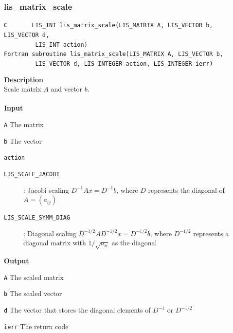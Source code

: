 \documentclass[a4paper]{article}
\newcommand{\namelistlabel}[1]{\mbox{#1}\hfill}
\newenvironment{namelist}[1]{%
\begin{list}{}
  {\let\makelabel\namelistlabel
  \settowidth{\labelwidth}{#1}
  \setlength{\leftmargin}{1.1\labelwidth}}
  }{%
\end{list}}
\begin{document}
\newpage
\subsubsection{lis\_matrix\_scale}
\begin{screen}
\verb|C       LIS_INT lis_matrix_scale(LIS_MATRIX A, LIS_VECTOR b, LIS_VECTOR d,|\\
\verb|         LIS_INT action)|\\
\verb|Fortran subroutine lis_matrix_scale(LIS_MATRIX A, LIS_VECTOR b,|\\
\verb|         LIS_VECTOR d, LIS_INTEGER action, LIS_INTEGER ierr)|
\end{screen}
{\bf Description}\\
\indent
Scale matrix $A$ and vector $b$.
\\ \\
\noindent
{\bf Input}
\begin{namelist}{XXXXXXXXXXXXXXXXXXXX}
\item[\tt A] The matrix
\item[\tt b] The vector
\item[\tt action] \begin{description}
\item[\tt LIS\_SCALE\_JACOBI]: Jacobi scaling $D^{-1}Ax=D^{-1}b$, where $D$
	   represents the diagonal of $A=(a_{ij})$
\item[\tt LIS\_SCALE\_SYMM\_DIAG]: Diagonal scaling
	   $D^{-1/2}AD^{-1/2}x=D^{-1/2}b$, where $D^{-1/2}$ represents
	   a diagonal matrix with $1/\sqrt{a_{ii}}$ as the diagonal
\end{description}
\end{namelist}
{\bf Output}
\begin{namelist}{XXXXXXXXXXXXXXXXXXXX}
\item[\tt A] The scaled matrix
\item[\tt b] The scaled vector
\item[\tt d]  The vector that stores the diagonal elements of $D^{-1}$ or $D^{-1/2}$
\item[\tt ierr] The return code
\end{namelist}

\newpage
\end{document}
